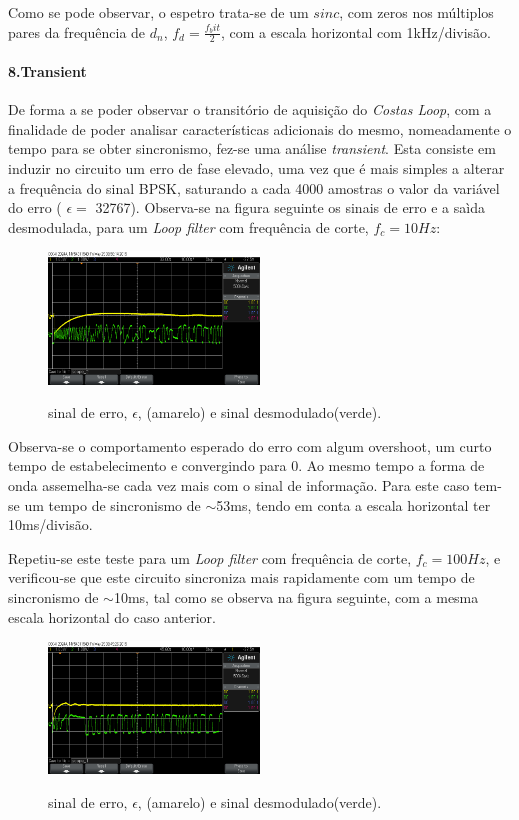 \documentclass[11pt]{article}
\numberwithin{equation}{section}
\begin{document}
Como se pode observar, o espetro trata-se de um $sinc$, com zeros nos múltiplos pares da frequência de $d_n$, $f_d=\frac{f_bit}{2}$, com a escala horizontal com 1kHz/divisão.

\paragraph{8.Transient} \hspace{0pt} \label{para:P3-8}

De forma a se poder observar o transitório de aquisição do \textit{Costas Loop}, com a finalidade de poder analisar características adicionais do mesmo, nomeadamente o tempo para se obter sincronismo, fez-se uma análise \textit{transient}. Esta consiste em induzir no circuito um erro de fase elevado, uma vez que é mais simples a alterar a frequência do sinal BPSK, saturando a cada 4000 amostras o valor da variável do erro ( $\epsilon=$ 32767). Observa-se na figura seguinte os sinais de erro e a saìda desmodulada, para um \textit{Loop filter} com frequência de corte, $f_c = 10Hz$:

\begin{figure}[H]
	\centering
	\includegraphics[width=0.5\textwidth]{./transient10Hz}~\\
	\caption{sinal de erro, $\epsilon$, (amarelo) e sinal desmodulado(verde).}
	\label{trans10}
\end{figure}
Observa-se o comportamento esperado do erro com algum overshoot, um curto tempo de estabelecimento e convergindo para 0. Ao mesmo tempo a forma de onda assemelha-se cada vez mais com o sinal de informação. Para este caso tem-se um tempo de sincronismo de $\sim$53ms, tendo em conta a escala horizontal ter 10ms/divisão.

Repetiu-se este teste para um \textit{Loop filter} com frequência de corte, $f_c = 100Hz$, e verificou-se que este circuito sincroniza mais rapidamente com um tempo de sincronismo de $\sim$10ms, tal como se observa na figura seguinte, com a mesma escala horizontal do caso anterior.

\begin{figure}[H]
	\centering
	\includegraphics[width=0.5\textwidth]{./transient100Hz}~\\
	\caption{sinal de erro, $\epsilon$, (amarelo) e sinal desmodulado(verde).}
	\label{trans100}
\end{figure}
\end{document}
